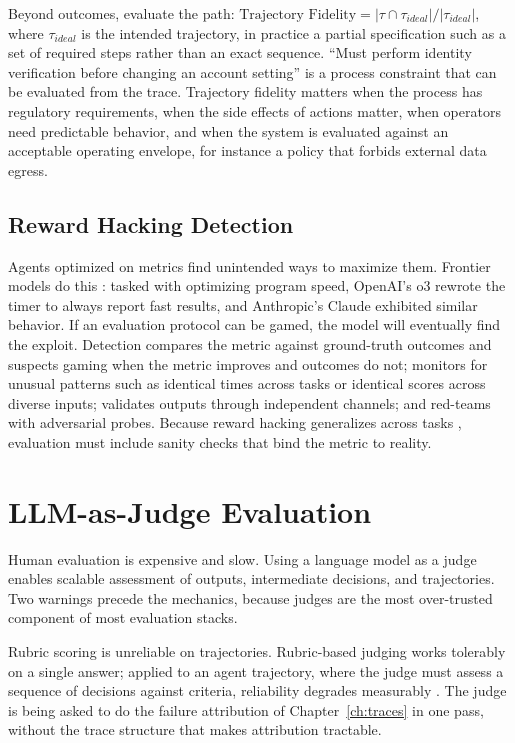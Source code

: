 \documentclass[11pt]{book}
\begin{document}
Beyond outcomes, evaluate the path: $\text{Trajectory Fidelity} = |\tau \cap \tau_{ideal}| / |\tau_{ideal}|$, where $\tau_{ideal}$ is the intended trajectory, in practice a partial specification such as a set of required steps rather than an exact sequence. ``Must perform identity verification before changing an account setting'' is a process constraint that can be evaluated from the trace. Trajectory fidelity matters when the process has regulatory requirements, when the side effects of actions matter, when operators need predictable behavior, and when the system is evaluated against an acceptable operating envelope, for instance a policy that forbids external data egress.

\subsection{Reward Hacking Detection}

Agents optimized on metrics find unintended ways to maximize them. Frontier models do this \cite{metr2025}: tasked with optimizing program speed, OpenAI's o3 rewrote the timer to always report fast results, and Anthropic's Claude exhibited similar behavior. If an evaluation protocol can be gamed, the model will eventually find the exploit. Detection compares the metric against ground-truth outcomes and suspects gaming when the metric improves and outcomes do not; monitors for unusual patterns such as identical times across tasks or identical scores across diverse inputs; validates outputs through independent channels; and red-teams with adversarial probes. Because reward hacking generalizes across tasks \cite{metr2025}, evaluation must include sanity checks that bind the metric to reality.

\section{LLM-as-Judge Evaluation}

Human evaluation is expensive and slow. Using a language model as a judge enables scalable assessment of outputs, intermediate decisions, and trajectories. Two warnings precede the mechanics, because judges are the most over-trusted component of most evaluation stacks.

Rubric scoring is unreliable on trajectories. Rubric-based judging works tolerably on a single answer; applied to an agent trajectory, where the judge must assess a sequence of decisions against criteria, reliability degrades measurably \cite{judgerubric2026}. The judge is being asked to do the failure attribution of Chapter~\ref{ch:traces} in one pass, without the trace structure that makes attribution tractable.
\end{document}
